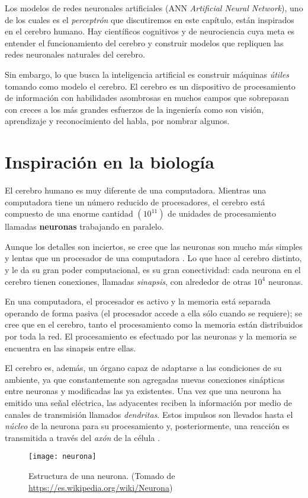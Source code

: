 Los modelos de redes neuronales artificiales (ANN \textit{Artificial
Neural Network}), uno de los cuales es el
\textit{perceptrón} que discutiremos en este capítulo, están
inspirados en el cerebro humano. Hay científicos cognitivos y de
neurociencia cuya meta es entender el funcionamiento del cerebro y
construir modelos que repliquen las redes neuronales naturales del
cerebro.

Sin embargo, lo que busca la inteligencia artificial es construir
máquinas \textit{útiles} tomando como modelo el cerebro. El cerebro es
un dispositivo de procesamiento de información con habilidades
asombrosas en muchos campos que sobrepasan con creces a los más
grandes esfuerzos de la ingeniería como son visión, aprendizaje y
reconocimiento del habla, por nombrar algunos.

\section{Inspiración en la biología}
El cerebro humano es muy diferente de una computadora. Mientras una
computadora tiene un número reducido de procesadores, el cerebro está
compuesto de una enorme cantidad $(10^{11})$ de unidades de
procesamiento llamadas \textbf{neuronas} trabajando en paralelo.

Aunque los detalles son inciertos, se cree que las neuronas son mucho
más simples y lentas que un procesador de una computadora
\cite{ethem}. Lo que hace al cerebro distinto, y le da su gran poder
computacional, es su gran conectividad: cada neurona en el cerebro
tienen conexiones, llamadas \textit{sinapsis}, con alrededor de otras
$10^{4}$ neuronas.

En una computadora, el procesador es activo y la memoria está separada
operando de forma pasiva (el procesador accede a ella sólo cuando se
requiere); se cree que en el cerebro, tanto el procesamiento como la
memoria están distribuidos por toda la red. El procesamiento es
efectuado por las neuronas y la memoria se encuentra en las sinapsis
entre ellas.

El cerebro es, además, un órgano capaz de adaptarse a las condiciones
de su ambiente, ya que constantemente son agregadas nuevas conexiones
sinápticas entre neuronas y modificadas las ya existentes. Una vez que
una neurona ha emitido una señal eléctrica, las adyacentes reciben la
información por medio de canales de transmisión llamados
\textit{dendritas}. Estos impulsos son llevados hasta el
\textit{núcleo} de la neurona para su procesamiento y, posteriormente,
una reacción es transmitida a través del \textit{axón} de la célula
\cite{memes}.
\begin{figure}[h]
  \texttt{[image: neurona]} \centering
  \caption{Estructura de una neurona. (Tomado de
    \url{https://es.wikipedia.org/wiki/Neurona})}
\end{figure}

